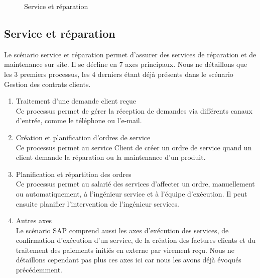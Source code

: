\begin{figure}[H]
    \label{fig-service-reparation}
    \noindent{}
    \caption{Service et réparation}
\end{figure}

\subsection{Service et réparation}

Le scénario service et réparation permet d’assurer des services de réparation et de maintenance sur site. Il se décline en 7 axes principaux. Nous ne détaillons que les 3 premiers processus, les 4 derniers étant déjà présents dans le scénario Gestion des contrats clients. \\

\begin{enumerate}
\item Traitement d’une demande client reçue \\
Ce processus permet de gérer la réception de demandes via différents canaux d’entrée, comme le téléphone ou l’e-mail. \\

\item Création et planification d’ordres de service \\
Ce processus permet au service Client de créer un ordre de service quand un client demande la réparation ou la maintenance d’un produit. \\

\item Planification et répartition des ordres \\
Ce processus permet au salarié des services d’affecter un ordre, manuellement ou automatiquement, à l’ingénieur service et à l’équipe d’exécution. Il peut ensuite planifier l’intervention de l’ingénieur services. \\

\item Autres axes \\
Le scénario SAP comprend aussi les axes d’exécution des services, de confirmation d’exécution d’un service, de la création des factures clients et du traitement des paiements initiés en externe par virement reçu. Nous ne détaillons cependant pas plus ces axes ici car nous les avons déjà évoqués précédemment.
\end{enumerate}

